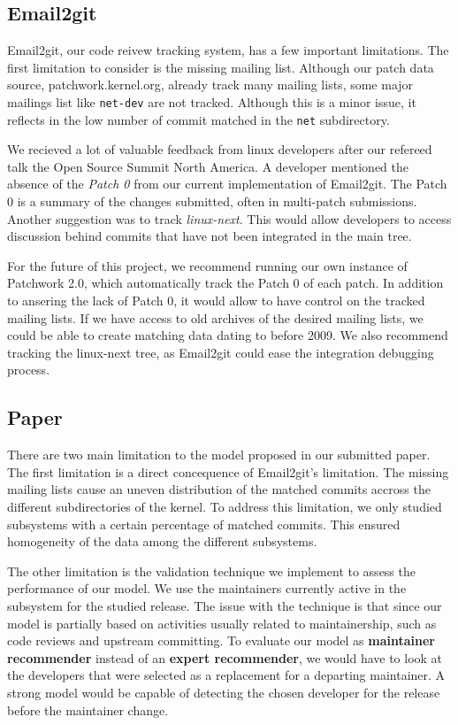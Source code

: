 \subsection{Email2git}

Email2git, our code reivew tracking system, has a few important limitations. The first limitation to consider is the missing mailing list. Although our patch data source, patchwork.kernel.org, already track many mailing lists, some major mailings list like \texttt{net-dev} are not tracked. Although this is a minor issue, it reflects in the low number of commit matched in the \texttt{net} subdirectory. 

We recieved a lot of valuable feedback from linux developers after our refereed talk the Open Source Summit North America. A developer mentioned the absence of the \textit{Patch 0} from our current implementation of Email2git. The Patch 0 is a summary of the changes submitted, often in multi-patch submissions. Another suggestion was to track \textit{linux-next}. This would allow developers to access discussion behind commits that have not been integrated in the main tree. 

For the future of this project, we recommend running our own instance of Patchwork 2.0, which automatically track the Patch 0 of each patch. In addition to ansering the lack of Patch 0, it would allow to have control on the tracked mailing lists. If we have access to old archives of the desired mailing lists, we could be able to create matching data dating to before 2009. We also recommend tracking the linux-next tree, as Email2git could ease the integration debugging process. 


\subsection{Paper}

There are two main limitation to the model proposed in our submitted paper. The first limitation is a direct concequence of Email2git's limitation. The missing mailing lists cause an uneven distribution of the matched commits accross the different subdirectories of the kernel. To address this limitation, we only studied subsystems with a certain percentage of matched commits. This ensured homogeneity of the data among the different subsystems. 

The other limitation is the validation technique we implement to assess the performance of our model. We use the maintainers currently active in the subsystem for the studied release. The issue with the technique is that since our model is partially based on activities usually related to maintainership, such as code reviews and upstream committing. To evaluate our model as \textbf{maintainer recommender} instead of an \textbf{expert recommender}, we would have to look at the developers that were selected as a replacement for a departing maintainer. A strong model would be capable of detecting the chosen developer for the release before the maintainer change.

